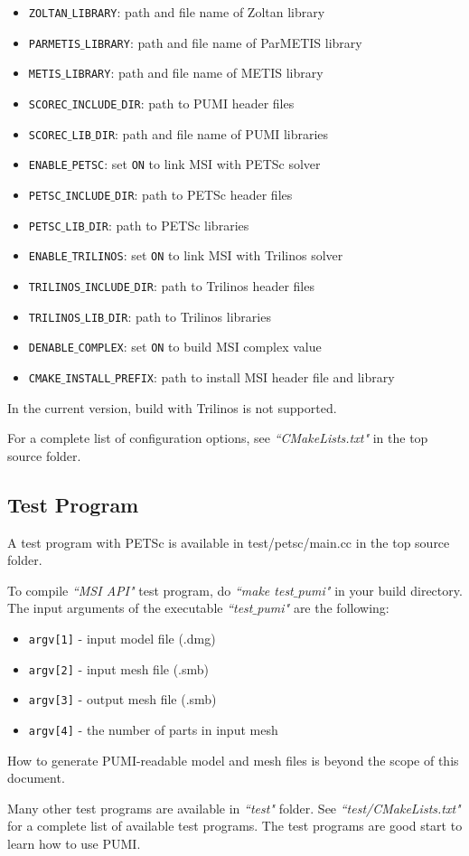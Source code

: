 \begin{itemize}
\item \texttt{ZOLTAN$\_$LIBRARY}: path and file name of Zoltan library
\item \texttt{PARMETIS$\_$LIBRARY}: path and file name of ParMETIS library
\item \texttt{METIS$\_$LIBRARY}: path and file name of METIS library
\item \texttt{SCOREC$\_$INCLUDE$\_$DIR}: path to PUMI header files
\item \texttt{SCOREC$\_$LIB$\_$DIR}: path and file name of PUMI libraries
\item \texttt{ENABLE$\_$PETSC}: set \texttt{ON} to link MSI with PETSc solver
\item \texttt{PETSC$\_$INCLUDE$\_$DIR}: path to PETSc header files
\item \texttt{PETSC$\_$LIB$\_$DIR}: path to PETSc libraries
\item \texttt{ENABLE$\_$TRILINOS}: set \texttt{ON} to link MSI with Trilinos solver
\item \texttt{TRILINOS$\_$INCLUDE$\_$DIR}: path to Trilinos header files
\item \texttt{TRILINOS$\_$LIB$\_$DIR}: path to Trilinos libraries
\item \texttt{DENABLE$\_$COMPLEX}: set \texttt{ON} to build MSI complex value
\item \texttt{CMAKE$\_$INSTALL$\_$PREFIX}: path to install MSI header file and library
\end{itemize}

In the current version, build with Trilinos is not supported.

For a complete list of configuration options, see \emph{``CMakeLists.txt"} in the top source folder. 

\subsection{Test Program}

A test program with PETSc is available in test/petsc/main.cc in the top source folder.

To compile \emph{``MSI API"} test program, do \emph{``make test$\_$pumi"} in your build directory. The input arguments of the executable \emph{``test$\_$pumi"} are the following:
\begin{itemize}
\item   \texttt{argv[1]} - input model file (.dmg)
\item   \texttt{argv[2]} - input mesh file (.smb)
\item   \texttt{argv[3]} - output mesh file (.smb)
\item   \texttt{argv[4]} - the number of parts in input mesh
\end{itemize}

How to generate PUMI-readable model and mesh files is beyond the scope of this document. 

Many other test programs are available in \emph{``test"} folder. See \emph{``test/CMakeLists.txt"} for a complete list of available test programs. The test programs are good start to learn how to use PUMI. 

